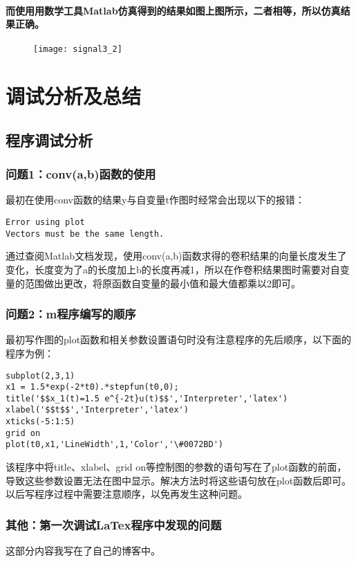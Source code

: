 \documentclass[UTF8]{ctexart}
\begin{document}
\paragraph{
而使用用数学工具Matlab仿真得到的结果如图上图所示，二者相等，所以仿真结果正确。
}
\begin{figure}[h]
\centering
\texttt{[image: signal3\_2]}
\end{figure}


\newpage
\section{调试分析及总结}
\subsection{程序调试分析}

\subsubsection{问题1：conv(a,b)函数的使用}
最初在使用conv函数的结果y与自变量t作图时经常会出现以下的报错：
\begin{lstlisting}
Error using plot
Vectors must be the same length.
\end{lstlisting}
通过查阅Matlab文档发现，使用conv(a,b)函数求得的卷积结果的向量长度发生了变化，长度变为了a的长度加上b的长度再减1，所以在作卷积结果图时需要对自变量的范围做出更改，将原函数自变量的最小值和最大值都乘以2即可。

\subsubsection{问题2：m程序编写的顺序}
最初写作图的plot函数和相关参数设置语句时没有注意程序的先后顺序，以下面的程序为例：
\begin{lstlisting}
subplot(2,3,1)
x1 = 1.5*exp(-2*t0).*stepfun(t0,0);
title('$$x_1(t)=1.5 e^{-2t}u(t)$$','Interpreter','latex')
xlabel('$$t$$','Interpreter','latex')
xticks(-5:1:5)
grid on
plot(t0,x1,'LineWidth',1,'Color','\#0072BD')
\end{lstlisting}
该程序中将title、xlabel、grid on等控制图的参数的语句写在了plot函数的前面，导致这些参数设置无法在图中显示。解决方法时将这些语句放在plot函数后即可。以后写程序过程中需要注意顺序，以免再发生这种问题。

\subsubsection{
其他：第一次调试LaTex程序中发现的问题
}
这部分内容我写在了自己的博客中。
\end{document}
